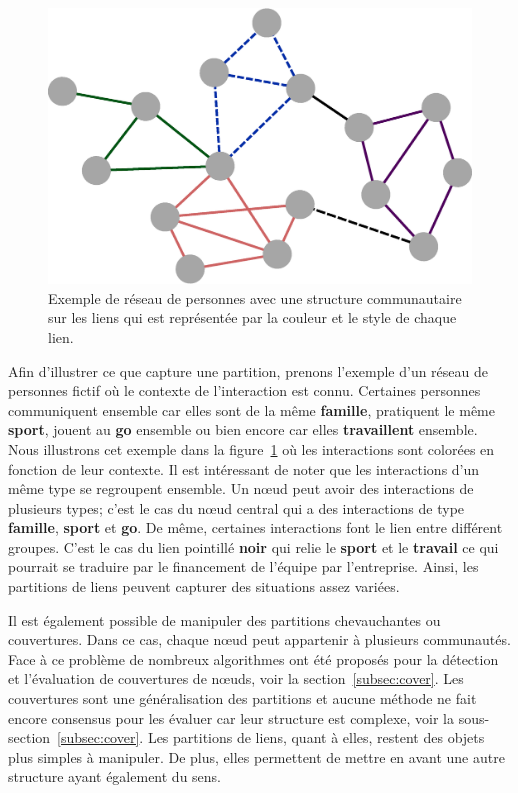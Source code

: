 \begin{figure}
\centering
\includegraphics[width=0.5\linewidth]{img/ExpectedNodes/Link_Partition}
\caption{Exemple de réseau de personnes avec une structure communautaire sur les liens qui est représentée par la couleur et le style de chaque lien.}
\label{fig:linkpartition_exemple_expected}
\end{figure}
Afin d'illustrer ce que capture une partition, prenons l'exemple d'un réseau de personnes fictif où le contexte de l'interaction est connu.
Certaines personnes communiquent ensemble car elles sont de la même \textbf{\textcolor{bleu_random}{famille}}, pratiquent le même \textbf{\textcolor{rose_cochon}{sport}}, jouent au \textbf{\textcolor{vert_fonce}{go}} ensemble ou bien encore car elles \textbf{\textcolor{violet_cool}{travaillent}} ensemble.
Nous illustrons cet exemple dans la figure~\ref{fig:linkpartition_exemple_expected} où les interactions sont colorées en fonction de leur contexte.
Il est intéressant de noter que les interactions d'un même type se regroupent ensemble.
Un n\oe{}ud peut avoir des interactions de plusieurs types; c'est le cas du n\oe{}ud central qui a des interactions de type \textbf{\textcolor{bleu_random}{famille}}, \textbf{\textcolor{rose_cochon}{sport}} et \textbf{\textcolor{vert_fonce}{go}}.
De même, certaines interactions font le lien entre différent groupes.
C'est le cas du lien pointillé \textbf{noir} qui relie le \textbf{\textcolor{rose_cochon}{sport}} et le \textbf{\textcolor{violet_cool}{travail}} ce qui pourrait se traduire par le financement de l'équipe par l'entreprise.
Ainsi, les partitions de liens peuvent capturer des situations assez variées.

Il est également possible de manipuler des partitions chevauchantes ou couvertures.
Dans ce cas, chaque n\oe{}ud peut appartenir à plusieurs communautés.
Face à ce problème de nombreux algorithmes ont été proposés pour la détection et l'évaluation de couvertures de n\oe{}uds, voir la section~\ref{subsec:cover}.
Les couvertures sont une généralisation des partitions et aucune méthode ne fait encore consensus pour les évaluer car leur structure est complexe, voir la sous-section~\ref{subsec:cover}.
Les partitions de liens, quant à elles, restent des objets plus simples à manipuler.
De plus, elles permettent de mettre en avant une autre structure ayant également du sens.



